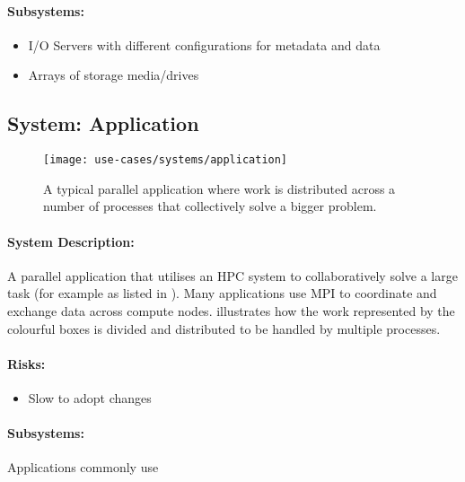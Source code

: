 \paragraph{Subsystems:}

\begin{itemize}
	\item I/O Servers with different configurations for metadata and data
	\item Arrays of storage media/drives
\end{itemize}


\subsection{System: Application}
\label{System: Application}

\begin{figure}
	\centering
	\texttt{[image: use-cases/systems/application]}
	\caption{A typical parallel application where work is distributed across a number of processes that collectively solve a bigger problem.}
	\label{fig:System: Application}
\end{figure}

\paragraph{System Description:}
A parallel application that utilises an HPC system to collaboratively solve a large task (for example as listed in ).
Many applications use MPI to coordinate and exchange data across compute nodes.
 illustrates how the work represented by the colourful boxes is divided and distributed to be handled by multiple processes.

\paragraph{Risks:}
\begin{itemize}
	\item Slow to adopt changes
\end{itemize}


\paragraph{Subsystems:}
Applications commonly use

